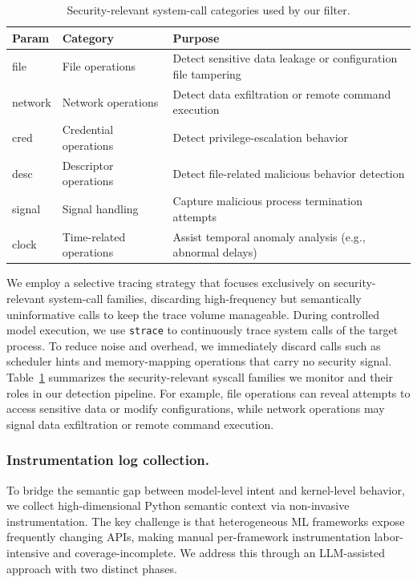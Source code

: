 \begin{table}[t!]
	\centering
	\caption{Security-relevant system-call categories used by our filter.}
	\begin{tabular}{p{} p{} p{}}
		\hline
		Param & Category & Purpose \\
		\hline
		file   & File operations  & Detect sensitive data leakage or configuration file tampering \\
		network & Network operations  & Detect data exfiltration or remote command execution \\
		cred   & Credential operations  & Detect privilege-escalation behavior \\
		desc   & Descriptor operations  & Detect file-related malicious behavior detection \\
		signal & Signal handling  & Capture malicious process termination attempts \\
		clock  & Time-related operations & Assist temporal anomaly analysis (e.g., abnormal delays) \\
		\hline
	\end{tabular}
	\label{tab:syscalltypes}
\end{table}

We employ a selective tracing strategy that focuses exclusively on security-relevant system-call families, discarding high-frequency but semantically uninformative calls to keep the trace volume manageable. During controlled model execution, we use \texttt{strace} to continuously trace system calls of the target process. To reduce noise and overhead, we immediately discard calls such as scheduler hints and memory-mapping operations that carry no security signal\cite{shakya2022analysisdetectionclassificationandroid}. Table~\ref{tab:syscalltypes} summarizes the security-relevant syscall families we monitor and their roles in our detection pipeline. For example, file operations can reveal attempts to access sensitive data or modify configurations, while network operations may signal data exfiltration or remote command execution.

\subsubsection{Instrumentation log collection.}
To bridge the semantic gap between model-level intent and kernel-level behavior, we collect high-dimensional Python semantic context via non-invasive instrumentation. The key challenge is that heterogeneous ML frameworks expose frequently changing APIs, making manual per-framework instrumentation labor-intensive and coverage-incomplete. We address this through an LLM-assisted approach with two distinct phases.

